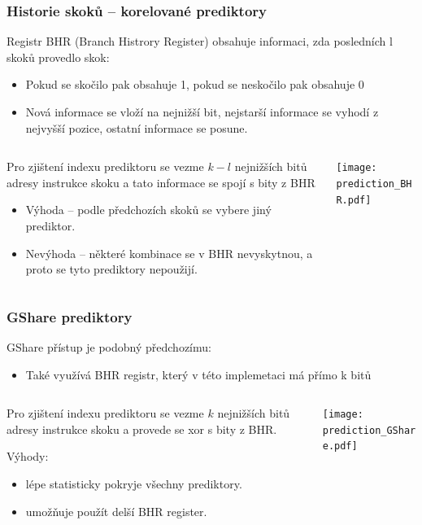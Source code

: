 \documentclass{beamer}
\begin{document}
\begin{frame}
\frametitle{Historie skoků -- korelované prediktory}

Registr BHR (Branch Histrory Register) obsahuje informaci, zda posledních l skoků provedlo skok:
\begin{itemize}
\item Pokud se skočilo pak obsahuje 1, pokud se neskočilo pak obsahuje 0
\item Nová informace se vloží na nejnižší bit, nejstarší informace se vyhodí z nejvyšší pozice, ostatní informace se posune.
\end{itemize}

\begin{columns}[T]
\begin{column}{0.5\textwidth}
\small
Pro zjištení indexu prediktoru se vezme $k-l$ nejnižších bitů adresy instrukce skoku a tato informace se spojí s bity z BHR
\begin{itemize}
\item Výhoda -- podle předchozích skoků se vybere jiný prediktor.
\item Nevýhoda -- některé kombinace se v BHR nevyskytnou, a proto se tyto prediktory nepoužijí.
\end{itemize}
\end{column}
\begin{column}{0.5\textwidth}
\texttt{[image: prediction\_BHR.pdf]}
\end{column}
\end{columns}

\end{frame}

\begin{frame}
\frametitle{GShare prediktory}

GShare přístup je podobný předchozímu:
\begin{itemize}
\item Také využívá BHR registr, který v této implemetaci má přímo k bitů
\end{itemize}

\begin{columns}[T]
\begin{column}{0.5\textwidth}
\small
Pro zjištení indexu prediktoru se vezme $k$ nejnižších bitů adresy instrukce skoku a provede se xor s bity z BHR.

Výhody:
\begin{itemize}
\item lépe statisticky pokryje všechny prediktory.
\item umožňuje použít delší BHR register.
\end{itemize}
\end{column}
\begin{column}{0.5\textwidth}
\texttt{[image: prediction\_GShare.pdf]}
\end{column}
\end{columns}
\end{frame}
\end{document}

